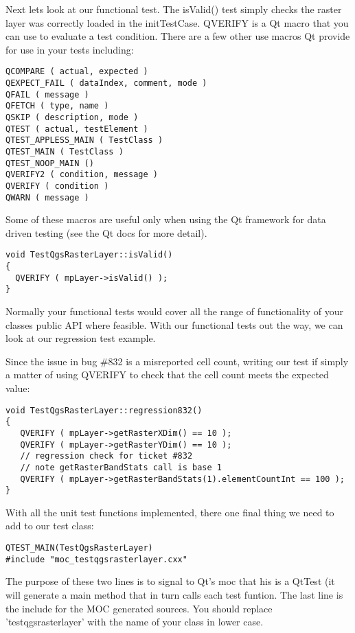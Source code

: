 Next lets look at our functional test. The isValid() test simply 
checks the raster layer was correctly loaded in the initTestCase. 
QVERIFY is a Qt macro that you can use to evaluate a test condition. 
There are a few other use macros Qt provide for use in your tests 
including:

\begin{verbatim}
QCOMPARE ( actual, expected )
QEXPECT_FAIL ( dataIndex, comment, mode )
QFAIL ( message )
QFETCH ( type, name )
QSKIP ( description, mode )
QTEST ( actual, testElement )
QTEST_APPLESS_MAIN ( TestClass )
QTEST_MAIN ( TestClass )
QTEST_NOOP_MAIN ()
QVERIFY2 ( condition, message )
QVERIFY ( condition )
QWARN ( message ) 
\end{verbatim}

Some of these macros are useful only when using the Qt framework 
for data driven testing (see the Qt docs for more detail).

\begin{verbatim}
void TestQgsRasterLayer::isValid()
{
  QVERIFY ( mpLayer->isValid() );
}
\end{verbatim}

Normally your functional tests would cover all the range of 
functionality of your classes public API where feasible. With our 
functional tests out the way, we can look at our regression test example.

Since the issue in bug \#832 is a misreported cell count, writing 
our test if simply a matter of using QVERIFY to check that the 
cell count meets the expected value:

\begin{verbatim}
void TestQgsRasterLayer::regression832()
{
   QVERIFY ( mpLayer->getRasterXDim() == 10 );
   QVERIFY ( mpLayer->getRasterYDim() == 10 );
   // regression check for ticket #832
   // note getRasterBandStats call is base 1
   QVERIFY ( mpLayer->getRasterBandStats(1).elementCountInt == 100 );
}
\end{verbatim}

With all the unit test functions implemented, there one final thing we 
need to add to our test class:

\begin{verbatim}
QTEST_MAIN(TestQgsRasterLayer)
#include "moc_testqgsrasterlayer.cxx"
\end{verbatim}

The purpose of these two lines is to signal to Qt's moc that his is a 
QtTest (it will generate a main method that in turn calls each test funtion.
The last line is the include for the MOC generated sources. You should 
replace 'testqgsrasterlayer' with the name of your class in lower case.


